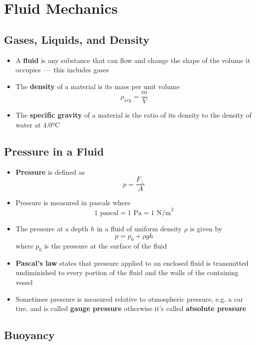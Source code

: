 \documentclass{article}
\begin{document}
\section{Fluid Mechanics}

\subsection{Gases, Liquids, and Density}

\begin{itemize}
  \item A \textbf{fluid} is any substance that can flow and change the shape of the volume it occupies — this includes gases

  \item The \textbf{density} of a material is its mass per unit volume \[\rho_\textrm{avg}=\frac{m}{V}\]

  \item The \textbf{specific gravity} of a material is the ratio of its density to the density of water at 4.0ºC
\end{itemize}

\subsection{Pressure in a Fluid}

\begin{itemize}
  \item \textbf{Pressure} is defined as \[p=\frac{F_\perp}{A}\]

  \item Pressure is measured in pascals where \[1 \textrm{ pascal}=1\textrm{ Pa}=1\textrm{ N/m}^2\]

  \item The pressure at a depth $h$ in a fluid of uniform density $\rho$ is given by \[p=p_0+\rho gh\] where $p_0$ is the pressure at the surface of the fluid

  \item \textbf{Pascal's law} states that pressure applied to an enclosed fluid is transmitted undiminished to every portion of the fluid and the walls of the containing vessel

  \item Sometimes pressure is measured relative to atmospheric pressure, e.g. a car tire, and is called \textbf{gauge pressure} otherwise it's called \textbf{absolute pressure}
\end{itemize}

\subsection{Buoyancy}
\end{document}
